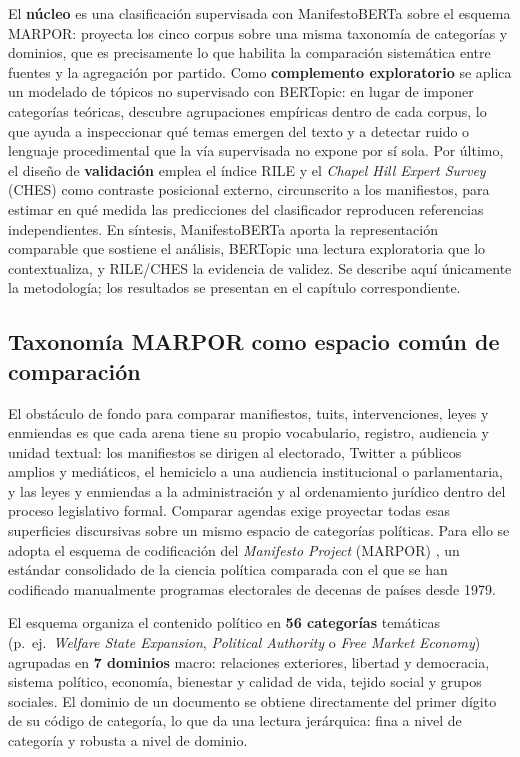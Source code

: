 El \textbf{núcleo} es una clasificación supervisada con ManifestoBERTa sobre el
esquema MARPOR: proyecta los cinco corpus sobre una misma taxonomía de categorías
y dominios, que es precisamente lo que habilita la comparación sistemática entre
fuentes y la agregación por partido. Como \textbf{complemento exploratorio} se
aplica un modelado de tópicos no supervisado con BERTopic: en lugar de imponer
categorías teóricas, descubre agrupaciones empíricas dentro de cada corpus, lo que
ayuda a inspeccionar qué temas emergen del texto y a detectar ruido o lenguaje
procedimental que la vía supervisada no expone por sí sola. Por último, el diseño
de \textbf{validación} emplea el índice RILE y el \emph{Chapel Hill Expert Survey}
(CHES) como contraste posicional externo, circunscrito a los manifiestos, para
estimar en qué medida las predicciones del clasificador reproducen referencias
independientes. En síntesis, ManifestoBERTa aporta la representación comparable
que sostiene el análisis, BERTopic una lectura exploratoria que lo contextualiza,
y RILE/CHES la evidencia de validez. Se describe aquí únicamente la metodología;
los resultados se presentan en el capítulo correspondiente.

\subsection{Taxonomía MARPOR como espacio común de comparación}
\label{sec:metodo-marpor}

El obstáculo de fondo para comparar manifiestos, tuits, intervenciones, leyes y
enmiendas es que cada arena tiene su propio vocabulario, registro, audiencia y
unidad textual: los manifiestos se dirigen al electorado, Twitter a públicos
amplios y mediáticos, el hemiciclo a una audiencia institucional o parlamentaria,
y las leyes y enmiendas a la administración y al ordenamiento jurídico dentro del
proceso legislativo formal. Comparar
agendas exige proyectar todas esas superficies discursivas sobre un mismo espacio
de categorías políticas. Para ello se adopta el esquema de
codificación del \emph{Manifesto Project} (MARPOR) \cite{marpor_mp_v5}, un
estándar consolidado de la ciencia política comparada con el que se han
codificado manualmente programas electorales de decenas de países desde
1979.

El esquema organiza el contenido político en \textbf{56 categorías} temáticas
(p.\ ej.\ \emph{Welfare State Expansion}, \emph{Political Authority} o
\emph{Free Market Economy}) agrupadas en \textbf{7 dominios} macro: relaciones
exteriores, libertad y democracia, sistema político, economía, bienestar y
calidad de vida, tejido social y grupos sociales. El dominio de un documento se
obtiene directamente del primer dígito de su código de categoría, lo que da una
lectura jerárquica: fina a nivel de categoría y robusta a nivel de dominio.

